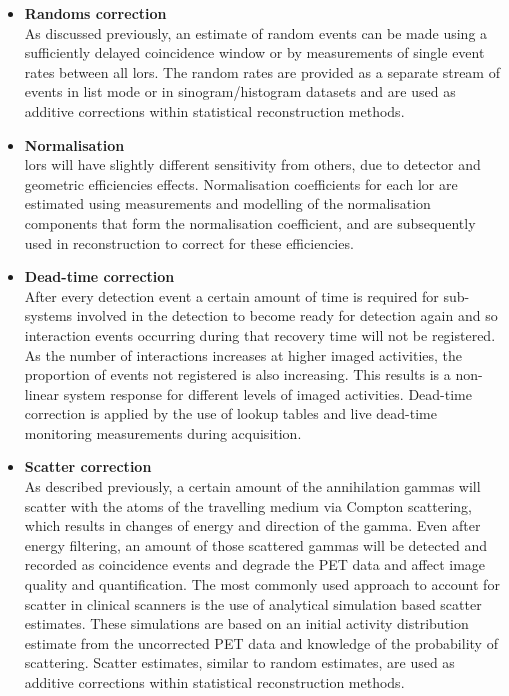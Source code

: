 \begin{itemize}
\item\textbf{Randoms correction}\\
As discussed previously, an estimate of random events can be made using a sufficiently delayed coincidence window or by measurements of single event rates between all \glspl{lor}. The random rates are provided as a separate stream of events in list mode or in sinogram/histogram datasets and are used as additive corrections within statistical reconstruction methods. 
\item\textbf{Normalisation}\\ 
\Glspl{lor} will have slightly different sensitivity from others, due to detector and geometric efficiencies effects. Normalisation coefficients for each \gls{lor} are estimated using measurements and modelling of the normalisation components that form the normalisation coefficient, and are subsequently used in reconstruction to correct for these efficiencies.
\item\textbf{Dead-time correction}\\
After every detection event a certain amount of time is required for sub-systems involved in the detection to become ready for detection again and so interaction events occurring during that recovery time will not be registered. As the number of interactions increases at higher imaged activities, the proportion of events not registered is also increasing. This results is a non-linear system response for different levels of imaged activities. Dead-time correction is applied by the use of lookup tables and live dead-time monitoring measurements during acquisition.
\item\textbf{Scatter correction}\\
As described previously, a certain amount of the annihilation gammas will scatter with the atoms of the travelling medium via Compton scattering, which results in changes of energy and direction of the gamma. Even after energy filtering, an amount of those scattered gammas will be detected and recorded as coincidence events and degrade the PET data and affect image quality and quantification. The most commonly used approach to account for scatter in clinical scanners is the use of analytical simulation based scatter estimates. These simulations are based on an initial activity distribution estimate from the uncorrected PET data and knowledge of the probability of scattering. Scatter estimates, similar to random estimates, are used as additive corrections within statistical reconstruction methods.

\end{itemize}
